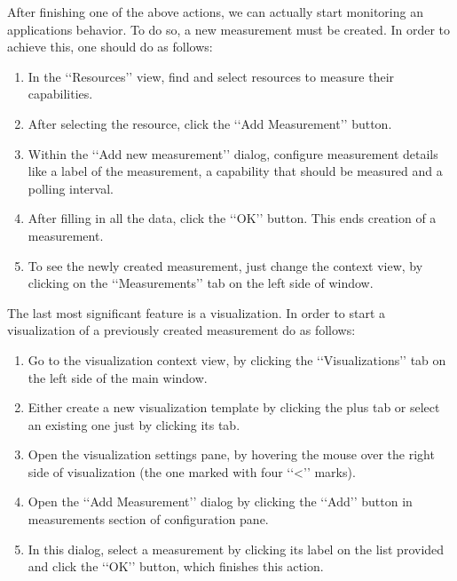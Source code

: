 After finishing one of the above actions, we can actually start monitoring an applications behavior. To do so, a new measurement must be created. In order to achieve this, one should do as follows:

\begin{enumerate}

\item In the \lq\lq{}Resources\rq\rq{} view, find and select resources to measure their capabilities.

\item After selecting the resource, click the \lq\lq{}Add Measurement\rq\rq{} button.

\item Within the \lq\lq{}Add new measurement\rq\rq{} dialog, configure measurement details like a label of the measurement, a capability that should be measured and a polling interval.

\item After filling in all the data, click the \lq\lq{}OK\rq\rq{} button. This ends creation of a measurement. 

\item To see the newly created measurement, just change the context view, by clicking on the \lq\lq{}Measurements\rq\rq{} tab on the left side of window.

\end{enumerate}

The last most significant feature is a visualization. In order to start a visualization of a previously created measurement do as follows:

\begin{enumerate}

\item Go to the visualization context view, by clicking the \lq\lq{}Visualizations\rq\rq{} tab on the left side of the main window.

\item Either create a new visualization template by clicking the plus tab or select an existing one just by clicking its tab.

\item Open the visualization settings pane, by hovering the mouse over the right side of visualization (the one marked with four \lq\lq{}<\rq\rq{} marks).

\item Open the \lq\lq{}Add Measurement\rq\rq{} dialog by clicking the \lq\lq{}Add\rq\rq{} button in measurements section of configuration pane.

\item In this dialog, select a measurement by clicking its label on the list provided and click the \lq\lq{}OK\rq\rq{} button, which finishes this action.

\end{enumerate}
